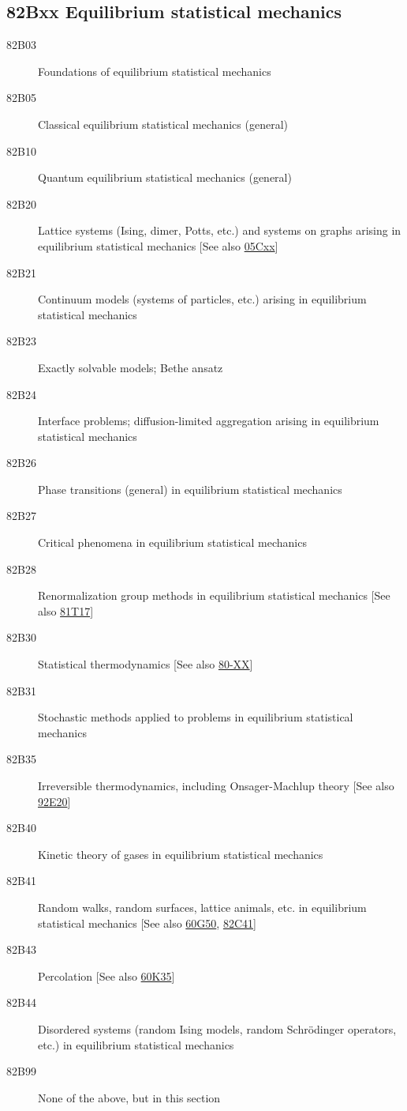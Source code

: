 \documentclass[letterpaper]{article}
\begin{document}
\subsection*{82Bxx  Equilibrium statistical mechanics }\label{82Bxx}
\begin{description}  
\item [82B03]\label{82B03} Foundations of equilibrium statistical mechanics
\item [82B05]\label{82B05} Classical equilibrium statistical mechanics (general)
\item [82B10]\label{82B10} Quantum equilibrium statistical mechanics (general)
\item [82B20]\label{82B20} Lattice systems (Ising, dimer, Potts, etc.) and systems on graphs arising in equilibrium statistical mechanics [See also \hyperref[05Cxx]{05Cxx}]
\item [82B21]\label{82B21} Continuum models (systems of particles, etc.) arising in equilibrium statistical mechanics
\item [82B23]\label{82B23} Exactly solvable models; Bethe ansatz
\item [82B24]\label{82B24} Interface problems; diffusion-limited aggregation arising in equilibrium statistical mechanics
\item [82B26]\label{82B26} Phase transitions (general) in equilibrium statistical mechanics
\item [82B27]\label{82B27} Critical phenomena in equilibrium statistical mechanics
\item [82B28]\label{82B28} Renormalization group methods in equilibrium statistical mechanics [See also \hyperref[81T17]{81T17}]
\item [82B30]\label{82B30} Statistical thermodynamics [See also \hyperref[80-XX]{80-XX}]
\item [82B31]\label{82B31} Stochastic methods applied to problems in equilibrium statistical mechanics
\item [82B35]\label{82B35} Irreversible thermodynamics, including Onsager-Machlup theory [See also \hyperref[92E20]{92E20}]
\item [82B40]\label{82B40} Kinetic theory of gases  in equilibrium statistical mechanics
\item [82B41]\label{82B41} Random walks, random surfaces, lattice animals, etc. in equilibrium statistical mechanics [See also \hyperref[60G50]{60G50}, \hyperref[82C41]{82C41}]
\item [82B43]\label{82B43} Percolation [See also \hyperref[60K35]{60K35}]
\item [82B44]\label{82B44} Disordered systems (random Ising models, random Schr\"{o}dinger operators, etc.) in equilibrium statistical mechanics
\item [82B99]\label{82B99} None of the above, but in this section
\end{description}
\end{document}
